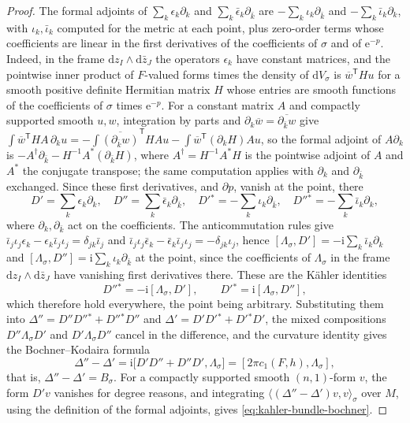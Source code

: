 \begin{proof}
The formal adjoints of $\sum_k\epsilon_k\partial_k$ and $\sum_k\bar\epsilon_k\partial_{\bar k}$ are $-\sum_k\iota_k\partial_{\bar k}$ and $-\sum_k\bar\iota_k\partial_k$, with $\iota_k,\bar\iota_k$ computed for the metric at each point, plus zero-order terms whose coefficients are linear in the first derivatives of the coefficients of $\sigma$ and of $\mathrm e^{-p}$. Indeed, in the frame $\mathrm dz_I\wedge\mathrm d\bar z_J$ the operators $\epsilon_k$ have constant matrices, and the pointwise inner product of $F$-valued forms times the density of $\mathrm dV_\sigma$ is $\overline w^{\mathsf T}Hu$ for a smooth positive definite Hermitian matrix $H$ whose entries are smooth functions of the coefficients of $\sigma$ times $\mathrm e^{-p}$. For a constant matrix $A$ and compactly supported smooth $u,w$, integration by parts and $\partial_k\overline w=\overline{\partial_{\bar k}w}$ give $\int\overline w^{\mathsf T}HA\,\partial_ku=-\int\overline{(\partial_{\bar k}w)}^{\mathsf T}HAu-\int\overline w^{\mathsf T}(\partial_kH)Au$, so the formal adjoint of $A\partial_k$ is $-A^\dagger\partial_{\bar k}-H^{-1}A^*(\partial_{\bar k}H)$, where $A^\dagger=H^{-1}A^*H$ is the pointwise adjoint of $A$ and $A^*$ the conjugate transpose; the same computation applies with $\partial_k$ and $\partial_{\bar k}$ exchanged. Since these first derivatives, and $\partial p$, vanish at the point, there
\[
 D'=\sum_k\epsilon_k\partial_k,\quad D''=\sum_k\bar\epsilon_k\partial_{\bar k},\quad
 D'{}^*=-\sum_k\iota_k\partial_{\bar k},\quad D''{}^*=-\sum_k\bar\iota_k\partial_k,
\]
where $\partial_k,\partial_{\bar k}$ act on the coefficients. The anticommutation rules give $\bar\iota_j\iota_j\epsilon_k-\epsilon_k\bar\iota_j\iota_j=\delta_{jk}\bar\iota_j$ and $\bar\iota_j\iota_j\bar\epsilon_k-\bar\epsilon_k\bar\iota_j\iota_j=-\delta_{jk}\iota_j$, hence $[\Lambda_\sigma,D']=-\mathrm i\sum_k\bar\iota_k\partial_k$ and $[\Lambda_\sigma,D'']=\mathrm i\sum_k\iota_k\partial_{\bar k}$ at the point, since the coefficients of $\Lambda_\sigma$ in the frame $\mathrm dz_I\wedge\mathrm d\bar z_J$ have vanishing first derivatives there. These are the K\"ahler identities
\[
 D''{}^*=-\mathrm i[\Lambda_\sigma,D'],\qquad
 D'{}^*=\mathrm i[\Lambda_\sigma,D''],
\]
which therefore hold everywhere, the point being arbitrary. Substituting them into $\Delta''=D''D''{}^*+D''{}^*D''$ and $\Delta'=D'D'{}^*+D'{}^*D'$, the mixed compositions $D''\Lambda_\sigma D'$ and $D'\Lambda_\sigma D''$ cancel in the difference, and the curvature identity gives the Bochner--Kodaira formula
\[
 \Delta''-\Delta'=\mathrm i\bigl[D'D''+D''D',\Lambda_\sigma\bigr]=[2\pi c_1(F,h),\Lambda_\sigma],
\]
that is, $\Delta''-\Delta'=B_\sigma$. For a compactly supported smooth $(n,1)$-form $v$, the form $D'v$ vanishes for degree reasons, and integrating $\langle(\Delta''-\Delta')v,v\rangle_\sigma$ over $M$, using the definition of the formal adjoints, gives \eqref{eq:kahler-bundle-bochner}.
\end{proof}


